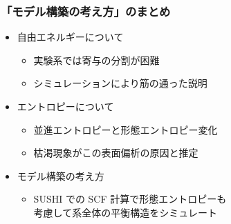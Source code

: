 \documentclass[unicode,12pt]{beamer}%
\begin{document}
\begin{frame}
	\frametitle{「モデル構築の考え方」のまとめ}
        \begin{boxnote}
            \vspace{-3mm}
            \begin{itemize}
                \item 自由エネルギーについて
                    \begin{itemize}
						\item 実験系では寄与の分割が困難
						\item シミュレーションにより筋の通った説明
					\end{itemize} 
                \item エントロピーについて
                    \begin{itemize}
                        \item 並進エントロピーと形態エントロピー変化
                        \item 枯渇現象がこの表面偏析の原因と推定
                    \end{itemize} 
                \item モデル構築の考え方
                    \begin{itemize}
                        \item SUSHI での SCF 計算で形態エントロピーも\\考慮して系全体の平衡構造をシミュレート
                    \end{itemize}
            \end{itemize}
        \end{boxnote}
\end{frame}
\end{document}
